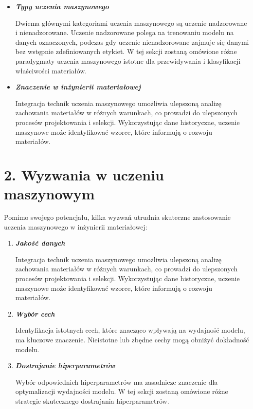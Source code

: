 \begin{itemize}

\item {\textbf{\textit{Typy uczenia maszynowego}}}

Dwiema głównymi kategoriami uczenia maszynowego są uczenie nadzorowane i nienadzorowane.
Uczenie nadzorowane polega na trenowaniu modelu na danych oznaczonych, podczas gdy uczenie nienadzorowane zajmuje się danymi bez wstępnie zdefiniowanych etykiet.
W tej sekcji zostaną omówione różne paradygmaty uczenia maszynowego istotne dla przewidywania i klasyfikacji właściwości materiałów.




\item {\textbf{\textit{Znaczenie w inżynierii materiałowej}}

Integracja technik uczenia maszynowego umożliwia ulepszoną analizę zachowania materiałów w różnych warunkach, co prowadzi do ulepszonych procesów projektowania i selekcji.
Wykorzystując dane historyczne, uczenie maszynowe może identyfikować wzorce, które informują o rozwoju materiałów.
}



\end{itemize}


{}
\section*{2. Wyzwania w uczeniu maszynowym}
\vspace{-1.0em}

Pomimo swojego potencjału, kilka wyzwań utrudnia skuteczne zastosowanie uczenia maszynowego w inżynierii materiałowej:
\begin{enumerate}

\item {\textbf{\textit{Jakość danych}}}


Integracja technik uczenia maszynowego umożliwia ulepszoną analizę zachowania materiałów w różnych warunkach, co prowadzi do ulepszonych procesów projektowania i selekcji.
Wykorzystując dane historyczne, uczenie maszynowe może identyfikować wzorce, które informują o rozwoju materiałów.

\item {\textbf{\textit{Wybór cech}}}


Identyfikacja istotnych cech, które znacząco wpływają na wydajność modelu, ma kluczowe znaczenie.
Nieistotne lub zbędne cechy mogą obniżyć dokładność modelu.

\item {\textbf{\textit{Dostrajanie hiperparametrów}}}


Wybór odpowiednich hiperparametrów ma zasadnicze znaczenie dla optymalizacji wydajności modelu.
W tej sekcji zostaną omówione różne strategie skutecznego dostrajania hiperparametrów.
\end{enumerate}

